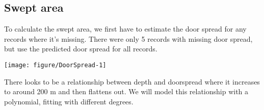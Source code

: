\documentclass[12pt]{article}\usepackage[]{graphicx}\usepackage[]{color}
\makeatletter
\def\maxwidth{ %
  \ifdim\Gin@nat@width>\linewidth
    \linewidth
  \else
    \Gin@nat@width
  \fi
}
\newenvironment{knitrout}{}{} %
\makeatother
\begin{document}
\subsection{Swept area}

To calculate the swept area, we first have to estimate the door spread for any
records where it's missing. There were only 5 records with missing door spread,
but use the predicted door spread for all records. \\

\begin{knitrout}\footnotesize
{}\color{fgcolor}

{\centering \texttt{[image: figure/DoorSpread-1]} 

}



\end{knitrout}

There looks to be a relationship between depth and doorspread where it
increases to around 200 m and then flattens out.  We will model this
relationship with a polynomial, fitting with different degrees. 
\end{document}
